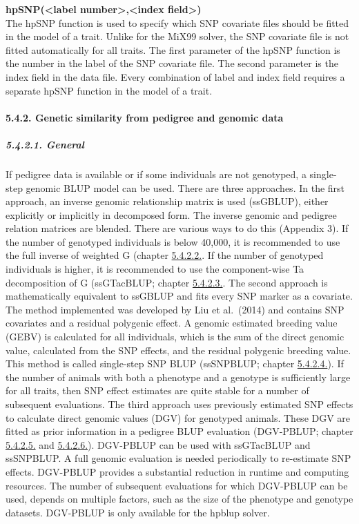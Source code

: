 \textbf{hpSNP(\textless label number\textgreater,\textless index
field\textgreater)}\\
The hpSNP function is used to specify which SNP covariate files should
be fitted in the model of a trait. Unlike for the MiX99 solver, the SNP
covariate file is not fitted automatically for all traits. The first
parameter of the hpSNP function is the number in the label of the SNP
covariate file. The second parameter is the index field in the data
file. Every combination of label and index field requires a separate
hpSNP function in the model of a trait.

\paragraph{5.4.2. Genetic similarity from pedigree and genomic
data}\label{Gene35}

\subparagraph{5.4.2.1. General}\label{Gene36}

If pedigree data is available or if some individuals are not genotyped,
a single-step genomic BLUP model can be used. There are three
approaches. In the first approach, an inverse genomic relationship
matrix is used (ssGBLUP), either explicitly or implicitly in decomposed
form. The inverse genomic and pedigree relation matrices are blended.
There are various ways to do this (Appendix 3). If the number of
genotyped individuals is below 40,000, it is recommended to use the full
inverse of weighted G (chapter \hyperref[Gene37]{5.4.2.2.}. If the
number of genotyped individuals is higher, it is recommended to use the
component-wise Ta decomposition of G (ssGTacBLUP; chapter
\hyperref[Gene46]{5.4.2.3.}. The second approach is mathematically
equivalent to ssGBLUP and fits every SNP marker as a covariate. The
method implemented was developed by Liu et al.~(2014) and contains SNP
covariates and a residual polygenic effect. A genomic estimated breeding
value (GEBV) is calculated for all individuals, which is the sum of the
direct genomic value, calculated from the SNP effects, and the residual
polygenic breeding value. This method is called single-step SNP BLUP
(ssSNPBLUP; chapter \hyperref[Gene47]{5.4.2.4.}). If the number of
animals with both a phenotype and a genotype is sufficiently large for
all traits, then SNP effect estimates are quite stable for a number of
subsequent evaluations. The third approach uses previously estimated SNP
effects to calculate direct genomic values (DGV) for genotyped animals.
These DGV are fitted as prior information in a pedigree BLUP evaluation
(DGV-PBLUP; chapter \hyperref[Gene48]{5.4.2.5.} and
\hyperref[Gene49]{5.4.2.6.}). DGV-PBLUP can be used with ssGTacBLUP and
ssSNPBLUP. A full genomic evaluation is needed periodically to
re-estimate SNP effects. DGV-PBLUP provides a substantial reduction in
runtime and computing resources. The number of subsequent evaluations
for which DGV-PBLUP can be used, depends on multiple factors, such as
the size of the phenotype and genotype datasets. DGV-PBLUP is only
available for the hpblup solver.

